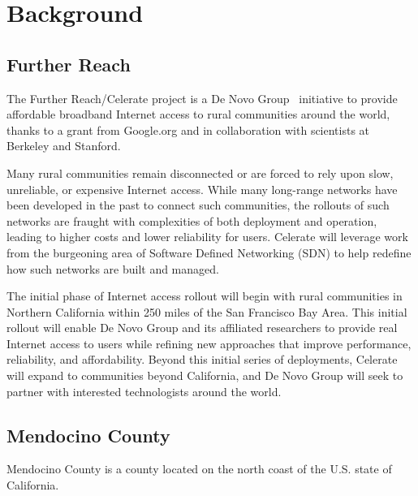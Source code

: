 
\section{Background}
\label{sec:background}

\subsection{Further Reach}
\label{sec:further-reach}


The Further Reach/Celerate project is a De Novo Group~\cite{denovo} initiative
to provide affordable broadband Internet access to rural communities around the
world, thanks to a grant from Google.org and in collaboration with scientists at
Berkeley and Stanford.

Many rural communities remain disconnected or are forced to rely upon slow,
unreliable, or expensive Internet access. While many long-range networks have
been developed in the past to connect such communities, the rollouts of such
networks are fraught with complexities of both deployment and operation, leading
to higher costs and lower reliability for users. Celerate will leverage work
from the burgeoning area of Software Defined Networking (SDN) to help redefine
how such networks are built and managed.

The initial phase of Internet access rollout will begin with rural communities
in Northern California within 250 miles of the San Francisco Bay Area. This
initial rollout will enable De Novo Group and its affiliated researchers to
provide real Internet access to users while refining new approaches that improve
performance, reliability, and affordability. Beyond this initial series of
deployments, Celerate will expand to communities beyond California, and De Novo
Group will seek to partner with interested technologists around the world.

\subsection{Mendocino County}
\label{sec:mendocino-county}

Mendocino County is a county located on the north coast of the U.S. state of
California.

